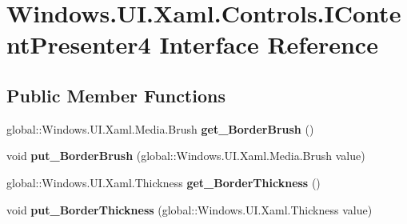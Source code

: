 \hypertarget{interface_windows_1_1_u_i_1_1_xaml_1_1_controls_1_1_i_content_presenter4}{}\section{Windows.\+U\+I.\+Xaml.\+Controls.\+I\+Content\+Presenter4 Interface Reference}
\label{interface_windows_1_1_u_i_1_1_xaml_1_1_controls_1_1_i_content_presenter4}
\subsection*{Public Member Functions}
\begin{DoxyCompactItemize}
\item 
\mbox{\label{interface_windows_1_1_u_i_1_1_xaml_1_1_controls_1_1_i_content_presenter4_ac7fd7fd864af0f81ad392923c67a8104}} 
global\+::\+Windows.\+U\+I.\+Xaml.\+Media.\+Brush {\bfseries get\+\_\+\+Border\+Brush} ()
\item 
\mbox{\label{interface_windows_1_1_u_i_1_1_xaml_1_1_controls_1_1_i_content_presenter4_a4bf1431ff8dce2bcdba162ef10e0f159}} 
void {\bfseries put\+\_\+\+Border\+Brush} (global\+::\+Windows.\+U\+I.\+Xaml.\+Media.\+Brush value)
\item 
\mbox{\label{interface_windows_1_1_u_i_1_1_xaml_1_1_controls_1_1_i_content_presenter4_aa8efa0fe881e1eb0b40490af2afb9d22}} 
global\+::\+Windows.\+U\+I.\+Xaml.\+Thickness {\bfseries get\+\_\+\+Border\+Thickness} ()
\item 
\mbox{\label{interface_windows_1_1_u_i_1_1_xaml_1_1_controls_1_1_i_content_presenter4_a29676ddecb0d27cd5443b81c5a6b1a68}} 
void {\bfseries put\+\_\+\+Border\+Thickness} (global\+::\+Windows.\+U\+I.\+Xaml.\+Thickness value)
\item 
\mbox{\label{interface_windows_1_1_u_i_1_1_xaml_1_1_controls_1_1_i_content_presenter4_a7e1575cbfaeb5ad47ddbf4528c2a01fe}} 

\end{DoxyCompactItemize}
